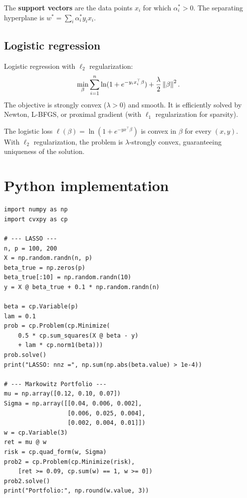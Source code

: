 \begin{proposition}
The \textbf{support vectors} are the data points $x_i$ for which
$\alpha_i^* > 0$. The separating hyperplane is
$w^* = \sum_i \alpha_i^* y_i x_i$.
\end{proposition}

\subsection{Logistic regression}

\begin{definition}
Logistic regression with $\ell_2$ regularization:
\[
  \min_\beta \sum_{i=1}^n \ln(1 + e^{-y_i x_i^\top \beta})
  + \frac{\lambda}{2} \left\| \beta \right\|^2.
\]
The objective is strongly convex ($\lambda > 0$) and smooth. It is efficiently
solved by Newton, L-BFGS, or proximal gradient (with $\ell_1$ regularization
for sparsity).
\end{definition}

\begin{theorem}
The logistic loss $\ell(\beta) = \ln(1 + e^{-y x^\top \beta})$ is convex in
$\beta$ for every $(x, y)$. With $\ell_2$ regularization, the problem is
$\lambda$-strongly convex, guaranteeing uniqueness of the solution.
\end{theorem}

\section{Python implementation}

\begin{codeblock}[title=\textbf{LASSO and portfolio with CVXPY}]
\begin{verbatim}
import numpy as np
import cvxpy as cp

# --- LASSO ---
n, p = 100, 200
X = np.random.randn(n, p)
beta_true = np.zeros(p)
beta_true[:10] = np.random.randn(10)
y = X @ beta_true + 0.1 * np.random.randn(n)

beta = cp.Variable(p)
lam = 0.1
prob = cp.Problem(cp.Minimize(
    0.5 * cp.sum_squares(X @ beta - y)
    + lam * cp.norm1(beta)))
prob.solve()
print("LASSO: nnz =", np.sum(np.abs(beta.value) > 1e-4))

# --- Markowitz Portfolio ---
mu = np.array([0.12, 0.10, 0.07])
Sigma = np.array([[0.04, 0.006, 0.002],
                  [0.006, 0.025, 0.004],
                  [0.002, 0.004, 0.01]])
w = cp.Variable(3)
ret = mu @ w
risk = cp.quad_form(w, Sigma)
prob2 = cp.Problem(cp.Minimize(risk),
    [ret >= 0.09, cp.sum(w) == 1, w >= 0])
prob2.solve()
print("Portfolio:", np.round(w.value, 3))
\end{verbatim}
\end{codeblock}

